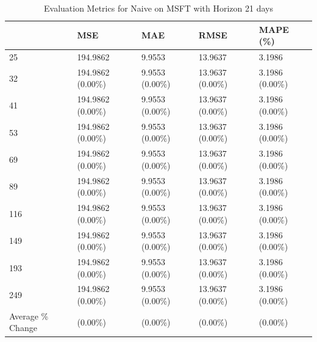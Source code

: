 \begin{table}
\caption{Evaluation Metrics for Naive on MSFT with Horizon 21 days}
\label{tab:naive_MSFT_h21_metrics}
\begin{tabular}{lllll}
\toprule
 & MSE & MAE & RMSE & MAPE (\%) \\
\midrule
25 & 194.9862 & 9.9553 & 13.9637 & 3.1986 \\
32 & 194.9862 (0.00\%) & 9.9553 (0.00\%) & 13.9637 (0.00\%) & 3.1986 (0.00\%) \\
41 & 194.9862 (0.00\%) & 9.9553 (0.00\%) & 13.9637 (0.00\%) & 3.1986 (0.00\%) \\
53 & 194.9862 (0.00\%) & 9.9553 (0.00\%) & 13.9637 (0.00\%) & 3.1986 (0.00\%) \\
69 & 194.9862 (0.00\%) & 9.9553 (0.00\%) & 13.9637 (0.00\%) & 3.1986 (0.00\%) \\
89 & 194.9862 (0.00\%) & 9.9553 (0.00\%) & 13.9637 (0.00\%) & 3.1986 (0.00\%) \\
116 & 194.9862 (0.00\%) & 9.9553 (0.00\%) & 13.9637 (0.00\%) & 3.1986 (0.00\%) \\
149 & 194.9862 (0.00\%) & 9.9553 (0.00\%) & 13.9637 (0.00\%) & 3.1986 (0.00\%) \\
193 & 194.9862 (0.00\%) & 9.9553 (0.00\%) & 13.9637 (0.00\%) & 3.1986 (0.00\%) \\
249 & 194.9862 (0.00\%) & 9.9553 (0.00\%) & 13.9637 (0.00\%) & 3.1986 (0.00\%) \\
Average \% Change & (0.00\%) & (0.00\%) & (0.00\%) & (0.00\%) \\
\bottomrule
\end{tabular}
\end{table}
